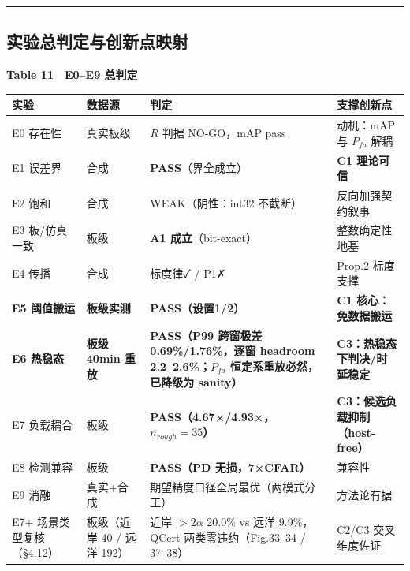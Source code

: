 \begin{center}\rule{0.5\linewidth}{0.5pt}\end{center}

\subsection{实验总判定与创新点映射}\label{ux5b9eux9a8cux603bux5224ux5b9aux4e0eux521bux65b0ux70b9ux6620ux5c04}

\textbf{Table 11　E0--E9 总判定}

{\def\LTcaptype{none} %
\begin{longtable}[]{@{}
  >{\raggedright\arraybackslash}p{}
  >{\raggedright\arraybackslash}p{}
  >{\raggedright\arraybackslash}p{}
  >{\raggedright\arraybackslash}p{}@{}}
\toprule\noalign{}
\begin{minipage}[b]{\linewidth}\raggedright
实验
\end{minipage} & \begin{minipage}[b]{\linewidth}\raggedright
数据源
\end{minipage} & \begin{minipage}[b]{\linewidth}\raggedright
判定
\end{minipage} & \begin{minipage}[b]{\linewidth}\raggedright
支撑创新点
\end{minipage} \\
\midrule\noalign{}
\endhead
\bottomrule\noalign{}
\endlastfoot
E0 存在性 & 真实板级 & \(R\) 判据 NO-GO，mAP pass & 动机：mAP 与
\(P_{fa}\) 解耦 \\
E1 误差界 & 合成 & \textbf{PASS}（界全成立） & \textbf{C1 理论可信} \\
E2 饱和 & 合成 & WEAK（阴性：int32 不截断） & 反向加强契约叙事 \\
E3 板/仿真一致 & 板级 & \textbf{A1 成立}（bit-exact） &
整数确定性地基 \\
E4 传播 & 合成 & 标度律✓ / P1✗ & Prop.2 标度支撑 \\
\textbf{E5 阈值搬运} & \textbf{板级实测} & \textbf{PASS（设置1/2）} &
\textbf{C1 核心：免数据搬运} \\
\textbf{E6 热稳态} & \textbf{板级 40min 重放} & \textbf{PASS（P99
跨窗极差 0.69\%/1.76\%，逐窗 headroom 2.2--2.6\%；\(P_{fa}\)
恒定系重放必然，已降级为 sanity）} &
\textbf{C3：热稳态下判决/时延稳定} \\
E7 负载耦合 & 板级 & \textbf{PASS（4.67×/4.93×，\(n_{rough}=35\)）} &
\textbf{C3：候选负载抑制（host-free）} \\
E8 检测兼容 & 板级 & \textbf{PASS（PD 无损，7×CFAR）} & 兼容性 \\
E9 消融 & 真实+合成 & 期望精度口径全局最优（两模式分工） & 方法论有据 \\
E7+ 场景类型复核（§4.12） & 板级（近岸 40 / 远洋 192） & 近岸
\(>2\alpha\) 20.0\% vs 远洋 9.9\%，QCert 两类零违约（Fig.33--34 /
37--38） & C2/C3 交叉维度佐证 \\
\end{longtable}
}

